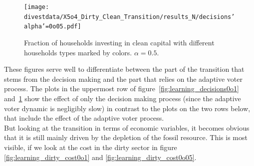 \begin{figure}[H]
	\centering
	\texttt{[image: divestdata/X5o4\_Dirty\_Clean\_Transition/results\_N/decisions'alpha'=0o05.pdf]}
	\caption{Fraction of households investing in clean capital with different households types marked by colors. $\alpha=0.5$.}
	\label{fig:learning_decisions0o05}
\end{figure}
These figures serve well to differentiate between the part of the transition that stems from the decision making and the part that relies on the adaptive voter process.
The plots in the uppermost row of figure~\ref{fig:learning_decisions0o1} and~\ref{fig:learning_decisions0o05} show the effect of only the decision making process (since the adaptive voter dynamic is negligibly slow) in contrast to the plots on the two rows below, that include the effect of the adaptive voter process.\\

But looking at the transition in terms of economic variables, it becomes obvious that it is still mainly driven by the depletion of the fossil resource. This is most visible, if we look at the cost in the dirty sector in figure \ref{fig:learning_dirty_cost0o1} and \ref{fig:learning_dirty_cost0o05}.

